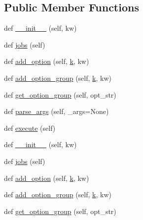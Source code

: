 \subsection*{Public Member Functions}
\begin{DoxyCompactItemize}
\item 
def \hyperlink{classwaflib_1_1_options_1_1_options_context_a7528362c0445246253c2897bb25c8cbe}{\+\_\+\+\_\+init\+\_\+\+\_\+} (self, kw)
\item 
def \hyperlink{classwaflib_1_1_options_1_1_options_context_a0187065321be14244835020d432e0d2d}{jobs} (self)
\item 
def \hyperlink{classwaflib_1_1_options_1_1_options_context_a967bd812f590a35d725f9ecb841e8c73}{add\+\_\+option} (self, \hyperlink{rfft2d_test_m_l_8m_adc468c70fb574ebd07287b38d0d0676d}{k}, kw)
\item 
def \hyperlink{classwaflib_1_1_options_1_1_options_context_ab80e21095bb29c6d3c5916b1ca5a2a55}{add\+\_\+option\+\_\+group} (self, \hyperlink{rfft2d_test_m_l_8m_adc468c70fb574ebd07287b38d0d0676d}{k}, kw)
\item 
def \hyperlink{classwaflib_1_1_options_1_1_options_context_a836995808c3fb9bdfe4328726e7dbdca}{get\+\_\+option\+\_\+group} (self, opt\+\_\+str)
\item 
def \hyperlink{classwaflib_1_1_options_1_1_options_context_a752b6da27459ab6ab321b9ba4a51794b}{parse\+\_\+args} (self, \+\_\+args=None)
\item 
def \hyperlink{classwaflib_1_1_options_1_1_options_context_a96c2ec435bdfb92055d5eba068f8a74c}{execute} (self)
\item 
def \hyperlink{classwaflib_1_1_options_1_1_options_context_a7528362c0445246253c2897bb25c8cbe}{\+\_\+\+\_\+init\+\_\+\+\_\+} (self, kw)
\item 
def \hyperlink{classwaflib_1_1_options_1_1_options_context_a0187065321be14244835020d432e0d2d}{jobs} (self)
\item 
def \hyperlink{classwaflib_1_1_options_1_1_options_context_a967bd812f590a35d725f9ecb841e8c73}{add\+\_\+option} (self, \hyperlink{rfft2d_test_m_l_8m_adc468c70fb574ebd07287b38d0d0676d}{k}, kw)
\item 
def \hyperlink{classwaflib_1_1_options_1_1_options_context_ab80e21095bb29c6d3c5916b1ca5a2a55}{add\+\_\+option\+\_\+group} (self, \hyperlink{rfft2d_test_m_l_8m_adc468c70fb574ebd07287b38d0d0676d}{k}, kw)
\item 
def \hyperlink{classwaflib_1_1_options_1_1_options_context_a836995808c3fb9bdfe4328726e7dbdca}{get\+\_\+option\+\_\+group} (self, opt\+\_\+str)

\end{DoxyCompactItemize}
